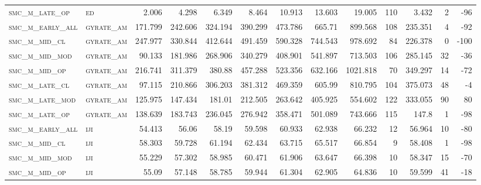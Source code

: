 \begin{landscape}
\begin{center}
\begin{footnotesize}
\begin{longtable}{llrrrrrrrr|rrr}
\textsc{smc\_m\_late\_op  } & \textsc{ed        }   & 2.006    & 4.298    & 6.349    & 8.464    & 10.913   & 13.603   & 19.005   & 110    & 3.432         & 2             & -96             \\
\textsc{smc\_m\_early\_all} & \textsc{gyrate\_am}   & 171.799  & 242.606  & 324.194  & 390.299  & 473.786  & 665.71   & 899.568  & 108    & 235.351       & 4             & -92             \\
\textsc{smc\_m\_mid\_cl   } & \textsc{gyrate\_am}   & 247.977  & 330.844  & 412.644  & 491.459  & 590.328  & 744.543  & 978.692  & 84     & 226.378       & 0             & -100            \\
\textsc{smc\_m\_mid\_mod  } & \textsc{gyrate\_am}   & 90.133   & 181.986  & 268.906  & 340.279  & 408.901  & 541.897  & 713.503  & 106    & 285.145       & 32            & -36             \\
\textsc{smc\_m\_mid\_op   } & \textsc{gyrate\_am}   & 216.741  & 311.379  & 380.88   & 457.288  & 523.356  & 632.166  & 1021.818 & 70     & 349.297       & 14            & -72             \\
\textsc{smc\_m\_late\_cl  } & \textsc{gyrate\_am}   & 97.115   & 210.866  & 306.203  & 381.312  & 469.359  & 605.99   & 810.795  & 104    & 375.073       & 48            & -4              \\
\textsc{smc\_m\_late\_mod } & \textsc{gyrate\_am}   & 125.975  & 147.434  & 181.01   & 212.505  & 263.642  & 405.925  & 554.602  & 122    & 333.055       & 90            & 80              \\
\textsc{smc\_m\_late\_op  } & \textsc{gyrate\_am}   & 138.639  & 183.743  & 236.045  & 276.942  & 358.471  & 501.089  & 743.666  & 115    & 147.8         & 1             & -98             \\
\textsc{smc\_m\_early\_all} & \textsc{iji       }   & 54.413   & 56.06    & 58.19    & 59.598   & 60.933   & 62.938   & 66.232   & 12     & 56.964        & 10            & -80             \\
\textsc{smc\_m\_mid\_cl   } & \textsc{iji       }   & 58.303   & 59.728   & 61.194   & 62.434   & 63.715   & 65.517   & 66.854   & 9      & 58.408        & 1             & -98             \\
\textsc{smc\_m\_mid\_mod  } & \textsc{iji       }   & 55.229   & 57.302   & 58.985   & 60.471   & 61.906   & 63.647   & 66.398   & 10     & 58.347        & 15            & -70             \\
\textsc{smc\_m\_mid\_op   } & \textsc{iji       }   & 55.09    & 57.148   & 58.785   & 59.944   & 61.304   & 62.905   & 64.836   & 10     & 59.599        & 41            & -18             \\

\end{longtable}
\end{footnotesize}
\end{center}
\end{landscape}
